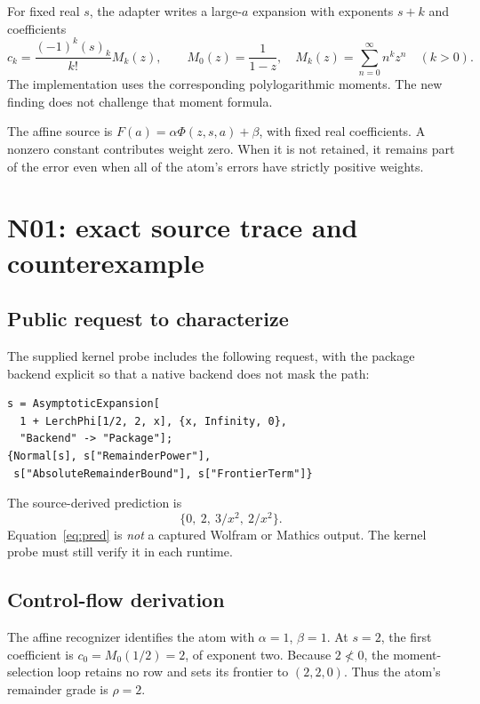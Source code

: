 \documentclass[11pt,letterpaper]{article}
\begin{document}
For fixed real $s$, the adapter writes a large-$a$ expansion with exponents
$s+k$ and coefficients
\begin{equation}\label{eq:coeff}
 c_k=\frac{(-1)^k(s)_k}{k!}M_k(z),\qquad
 M_0(z)=\frac1{1-z},\quad
 M_k(z)=\sum_{n=0}^{\infty}n^kz^n\quad(k>0).
\end{equation}
The implementation uses the corresponding polylogarithmic moments. The new
finding does not challenge that moment formula.\cite{dirichlet}

The affine source is $F(a)=\alpha\Phi(z,s,a)+\beta$, with fixed real
coefficients. A nonzero constant contributes weight zero. When it is not
retained, it remains part of the error even when all of the atom's errors
have strictly positive weights.

\section{N01: exact source trace and counterexample}
\subsection{Public request to characterize}
The supplied kernel probe includes the following request, with the package
backend explicit so that a native backend does not mask the path:
\begin{lstlisting}
s = AsymptoticExpansion[
  1 + LerchPhi[1/2, 2, x], {x, Infinity, 0},
  "Backend" -> "Package"];
{Normal[s], s["RemainderPower"],
 s["AbsoluteRemainderBound"], s["FrontierTerm"]}
\end{lstlisting}
The source-derived prediction is
\begin{equation}\label{eq:pred}
 \{0,\ 2,\ 3/x^2,\ 2/x^2\}.
\end{equation}
Equation~\eqref{eq:pred} is \emph{not} a captured Wolfram or Mathics output.
The kernel probe must still verify it in each runtime.

\subsection{Control-flow derivation}
The affine recognizer identifies the atom with $\alpha=1$, $\beta=1$. At
$s=2$, the first coefficient is $c_0=M_0(1/2)=2$, of exponent two.
Because $2\not<0$, the moment-selection loop retains no row and sets its
frontier to $(2,2,0)$. Thus the atom's remainder grade is $\rho=2$.
\end{document}

